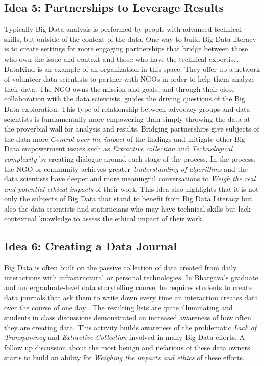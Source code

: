 \documentclass{sig-alternate}
\begin{document}
\subsection{Idea 5: Partnerships to Leverage Results}
Typically Big Data analysis is performed by people with advanced technical skills, but outside of the context of the data.  One way to build Big Data literacy is to create settings for more engaging partnerships that bridge between those who own the issue and context and those who have the technical expertise.  DataKind \cite{data_kind_2015} is an example of an organization in this space. They offer up a network of volunteer data scientists to partner with NGOs in order to help them analyze their data.  The NGO owns the mission and goals, and through their close collaboration with the data scientists, guides the driving questions of the Big Data exploration.  This type of relationship between advocacy groups and data scientists is fundamentally more empowering than simply throwing the data at the proverbial wall for analysis and results.  Bridging partnerships give subjects of the data more \textit{Control over the impact} of the findings and mitigate other Big Data empowerment issues such as \textit{Extractive collection} and \textit{Technological complexity} by creating dialogue around each stage of the process. In the process, the NGO or community achieves greater \textit{Understanding of algorithms} and the data scientists have deeper and more meaningful conversations to \textit{Weigh the real and potential ethical impacts} of their work. This idea also highlights that it is not only the subjects of Big Data that stand to benefit from Big Data Literacy but also the data scientists and statisticians who may have technical skills but lack contextual knowledge to assess the ethical impact of their work.

\subsection{Idea 6: Creating a Data Journal}
Big Data is often built on the passive collection of data created from daily interactions with infrastructural or personal technologies.  In Bhargava's graduate and undergraduate-level data storytelling course, he requires students to create data journals that ask them to write down every time an interaction creates data over the course of one day \cite{cms631_2015}.  The resulting lists are quite illuminating and students in class discussions demonstrated an increased awareness of how often they are creating data. This activity builds awareness of the problematic \textit{Lack of Transparency} and \textit{Extractive Collection} involved in many Big Data efforts.  A follow up discussion about the most benign and nefarious of these data owners starts to build an ability for \textit{Weighing the impacts and ethics} of these efforts.
\end{document}

